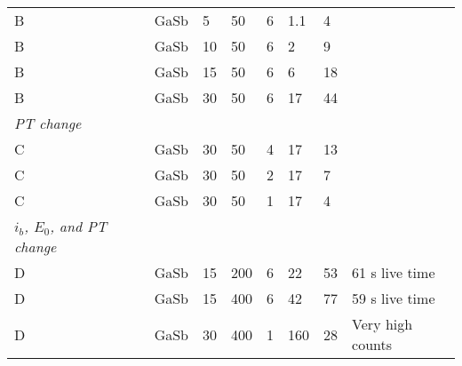 \begin{table}[phtb]
\begin{center}
\begin{tabular}{lllllllp{3.5cm}}
            B                                  & GaSb            & 5              & 50             & 6           & 1.1         & 4           &                     \\
            B                                  & GaSb            & 10             & 50             & 6           & 2          & 9           &                     \\
            B                                  & GaSb            & 15             & 50             & 6           & 6          & 18          &                     \\
            B                                  & GaSb            & 30             & 50             & 6           & 17           & 44          &                     \\
            \hline
            \emph{PT change}                   &                 &                &                &             &              &             &                     \\
            C                                  & GaSb            & 30             & 50             & 4           & 17           & 13          &                     \\
            C                                  & GaSb            & 30             & 50             & 2           & 17           & 7           &                     \\
            C                                  & GaSb            & 30             & 50             & 1           & 17           & 4           &                     \\
            \hline
            \emph{$i_b$, $E_0$, and PT change} &                 &                &                &             &              &             &                     \\
            D                                  & GaSb            & 15             & 200            & 6           & 22           & 53          & 61 s live time      \\
            D                                  & GaSb            & 15             & 400            & 6           & 42           & 77          & 59 s live time      \\
            D                                  & GaSb            & 30             & 400            & 1           & 160          & 28          & Very high counts    \\

\end{tabular}
\end{center}
\end{table}
